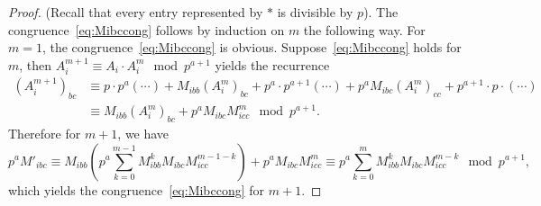 \documentclass[letterpaper, 11pt, thm-restate]{article}
\numberwithin{equation}{section}
\theoremstyle{definition}
\theoremstyle{definition}
\theoremstyle{definition}
\begin{document}
\begin{proof}
    (Recall that every entry represented by $*$ is divisible by $p$).
    The congruence~\eqref{eq:Mibccong} follows by induction on $m$ the following way.
    For $m = 1$, the congruence~\eqref{eq:Mibccong} is obvious.
    Suppose~\eqref{eq:Mibccong} holds for $m$, then $A_i^{m+1} \equiv A_i \cdot A_i^{m} \mod p^{a+1}$ yields the recurrence 
    \begin{align*}
    \left(A_i^{m+1}\right)_{bc} & \equiv p \cdot p^a ( \cdots ) + M_{ibb} \left(A_i^{m}\right)_{bc} + p^a \cdot p^{a+1} ( \cdots ) + p^aM_{ibc} \left(A_i^{m}\right)_{cc} + p^{a+1} \cdot p \cdot ( \cdots ) \\
    & \equiv M_{ibb} \left(A_i^{m}\right)_{bc} + p^aM_{ibc} M_{icc}^{m} \mod p^{a+1}.
    \end{align*}
    Therefore for $m + 1$, we have
    \[
    p^a M'_{ibc} \equiv  M_{ibb} \left(p^a\sum_{k=0}^{m-1} M_{ibb}^k M_{ibc} M_{icc}^{m-1-k}\right) + p^a M_{ibc} M_{icc}^{m} \equiv p^a \sum_{k=0}^{m} M_{ibb}^k M_{ibc} M_{icc}^{m-k} \mod p^{a+1},
    \]
    which yields the congruence~\eqref{eq:Mibccong} for $m+1$.
    

\end{proof}
\end{document}
